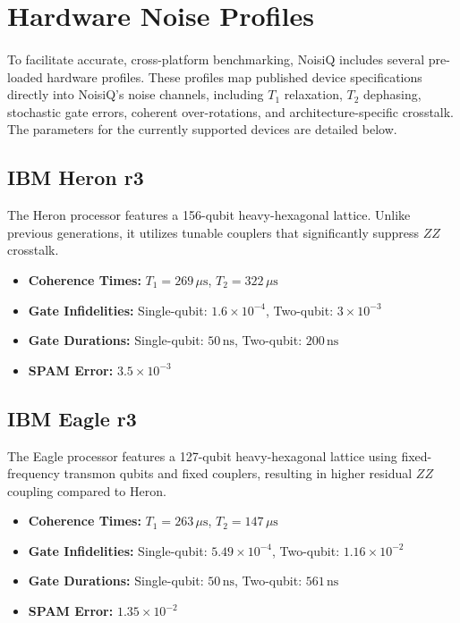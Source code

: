 \documentclass[10pt,twocolumn]{article}
\begin{document}
\clearpage
\appendix

\section{Hardware Noise Profiles}
\label{sec:hardware_profiles}
\paragraph{}
    To facilitate accurate, cross-platform benchmarking, NoisiQ includes several pre-loaded hardware profiles. These profiles map published device specifications directly into NoisiQ's noise channels, including $T_1$ 
      relaxation, $T_2$ dephasing, stochastic gate errors, coherent over-rotations, and architecture-specific crosstalk. The parameters for the currently supported devices are detailed below.

\subsection{IBM Heron r3 \cite{ibm_platform, abughanem2024}}
\label{subsec:profile_heron}
    The Heron processor features a 156-qubit heavy-hexagonal lattice. Unlike previous generations, it utilizes tunable couplers that significantly suppress $ZZ$ crosstalk.
    \begin{itemize}
        \item \textbf{Coherence Times:} $T_1 = 269\,\mu\text{s}$, $T_2 = 322\,\mu\text{s}$
        \item \textbf{Gate Infidelities:} Single-qubit: $1.6 \times 10^{-4}$, Two-qubit: $3 \times 10^{-3}$
        \item \textbf{Gate Durations:} Single-qubit: $50\,\text{ns}$, Two-qubit: $200\,\text{ns}$
        \item \textbf{SPAM Error:} $3.5 \times 10^{-3}$
    \end{itemize}

\subsection{IBM Eagle r3 \cite{abughanem2024}}
\label{subsec:profile_eagle}
    The Eagle processor features a 127-qubit heavy-hexagonal lattice using fixed-frequency transmon qubits and fixed couplers, resulting in higher residual $ZZ$ coupling compared to Heron.
    \begin{itemize}
        \item \textbf{Coherence Times:} $T_1 = 263\,\mu\text{s}$, $T_2 = 147\,\mu\text{s}$
        \item \textbf{Gate Infidelities:} Single-qubit: $5.49 \times 10^{-4}$, Two-qubit: $1.16 \times 10^{-2}$
        \item \textbf{Gate Durations:} Single-qubit: $50\,\text{ns}$, Two-qubit: $561\,\text{ns}$
        \item \textbf{SPAM Error:} $1.35 \times 10^{-2}$
    \end{itemize}
\end{document}
